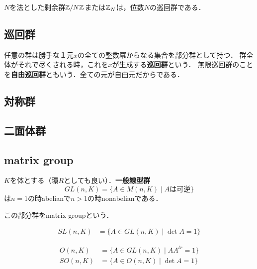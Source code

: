 \documentclass[uplatex,dvipdfmx]{jsreport}
\begin{document}
\begin{example}
    $N$を法とした剰余群$\mathbb{Z}/N\mathbb{Z}$または$\mathbb{Z}_N$は，位数$N$の巡回群である．
\end{example}

\subsection{巡回群}

\begin{example}
    任意の群は勝手な１元$x$の全ての整数冪からなる集合を部分群として持つ．
    群全体がそれで尽くされる時，これを$x$が生成する\textbf{巡回群}という．
    無限巡回群のことを\textbf{自由巡回群}ともいう．全ての元が自由元だからである．
\end{example}

\subsection{対称群}

\subsection{二面体群}

\subsection{matrix group}

\begin{definition}
    $K$を体とする（環$R$としても良い）．\textbf{一般線型群}
    \[ GL(n,K)=\{ A\in M(n,K)\mid Aは可逆 \} \]
    は$n=1$の時abelianで$n>1$の時nonabelianである．

    この部分群をmatrix groupという．
\end{definition}

\begin{definition}
    \begin{align*}
        SL(n,K) &= \{ A\in GL(n,K)\mid \det A=1 \}
    \end{align*}
\end{definition}

\begin{definition}
    \begin{align*}
        O(n,K) &= \{ A\in GL(n,K)\mid AA^{tr}=1 \}\\
        SO(n,K) &= \{ A\in O(n,K)\mid \det A=1 \}
    \end{align*}
\end{definition}
\end{document}
